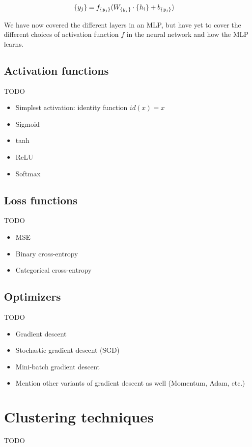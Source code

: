 \begin{align}
    \label{eqn:output-layer-ann}
    \left\{ {y}_{j} \right\} &= f_{\left\{ {y}_{j} \right\}}(W_{\left\{ {y}_{j} \right\}} \cdot \left\{ {h}_{i} \right\} + b_{\left\{ {y}_{j} \right\}})
\end{align}

We have now covered the different layers in an MLP, but have yet to cover the different choices of activation function $f$ in the neural network and how the MLP learns.

\subsection{Activation functions}
\label{sec:activation-functions-ann}
TODO
\begin{itemize}
    \item Simplest activation: identity function $id(x)=x$
    \item Sigmoid
    \item tanh
    \item ReLU
    \item Softmax
\end{itemize}

\subsection{Loss functions}
\label{sec:loss-functions-ann}
TODO
\begin{itemize}
    \item MSE
    \item Binary cross-entropy
    \item Categorical cross-entropy
\end{itemize}

\subsection{Optimizers}
\label{sec:optimizers-ann}
TODO
\begin{itemize}
    \item Gradient descent
    \item Stochastic gradient descent (SGD)
    \item Mini-batch gradient descent
    \item Mention other variants of gradient descent as well (Momentum, Adam, etc.)
\end{itemize}

\section{Clustering techniques}
TODO


